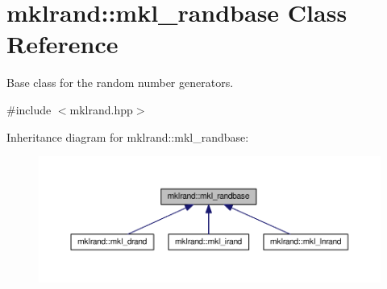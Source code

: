 \hypertarget{classmklrand_1_1mkl__randbase}{}\section{mklrand\+:\+:mkl\+\_\+randbase Class Reference}
\label{classmklrand_1_1mkl__randbase}


Base class for the random number generators.  




{\ttfamily \#include $<$mklrand.\+hpp$>$}



Inheritance diagram for mklrand\+:\+:mkl\+\_\+randbase\+:
\nopagebreak
\begin{figure}[H]
\begin{center}
\leavevmode
\includegraphics[width=350pt]{db/d0e/classmklrand_1_1mkl__randbase__inherit__graph}
\end{center}
\end{figure}
